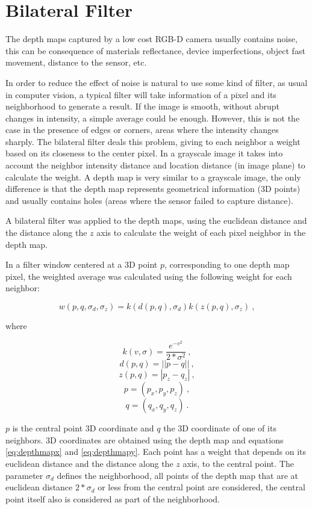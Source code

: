 \section{Bilateral Filter}


The depth maps captured by a low cost RGB-D camera usually contains noise, this can be 
consequence of materials reflectance, device imperfections, object fast movement, distance to the 
sensor, etc. 

In order to reduce the effect of noise is natural to use some kind of filter, as usual in computer 
vision, a typical filter will take information of a pixel and its neighborhood to generate a result. 
If the image is smooth, without abrupt changes in intensity, a simple average could be enough. However, this 
is not the case in the presence of edges or corners, areas where the intensity changes sharply. 
The bilateral filter deals this problem, giving to each neighbor a weight based on its closeness  
to the center pixel. In a grayscale image it takes into account 
the neighbor intensity distance and location distance (in image plane) to calculate the weight.  A depth map is very similar to a grayscale 
image, the only difference is that the depth map represents geometrical information (3D points) and usually contains holes 
(areas where the sensor failed to capture distance). 

A bilateral filter was applied to the depth maps, using the euclidean distance and the distance along the $z$ axis to calculate 
the weight of each pixel neighbor in the depth map. 

In a filter window centered at a 3D point $p$, corresponding to one depth map pixel, 
the weighted average was calculated using the following weight for each neighbor:


$$ w(p,q,\sigma_d,\sigma_z) = k(d(p,q),\sigma_d) k(z(p,q),\sigma_z)\ , $$

\noindent where 

$$ k(v,\sigma) = \frac{e^{-v^2}}{2*\sigma^2}\ , $$
$$ d(p,q) = ||p - q||\ , $$
$$ z(p,q) = |p_z - q_z|\ , $$
$$ p = (p_x,p_y,p_z)\ , $$ 
$$ q = (q_x,q_y,q_z)\ . $$

\noindent $p$ is the central point 3D coordinate and $q$ the 3D coordinate of one of its neighbors. 3D coordinates are obtained using
 the depth map and equations \ref{eq:depthmapx} and \ref{eq:depthmapy}.  Each point has a weight that depends on its euclidean distance and
 the distance along the $z$ axis, to the central point. The parameter $\sigma_d$ defines 
the neighborhood, all points of the depth map that are at euclidean distance $2*\sigma_d$ or less from the central point are considered, the 
central point itself also is considered as part of the neighborhood.


